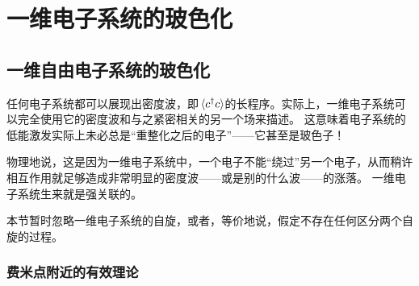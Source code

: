 \chapter{一维电子系统的玻色化}

\section{一维自由电子系统的玻色化}

任何电子系统都可以展现出密度波，即$\expval*{{c}^\dagger {c}}$的长程序。实际上，一维电子系统可以完全使用它的密度波和与之紧密相关的另一个场来描述。
这意味着电子系统的低能激发实际上未必总是“重整化之后的电子”——它甚至是玻色子！

物理地说，这是因为一维电子系统中，一个电子不能“绕过”另一个电子，从而稍许相互作用就足够造成非常明显的密度波——或是别的什么波——的涨落。
一维电子系统生来就是强关联的。

本节暂时忽略一维电子系统的自旋，或者，等价地说，假定不存在任何区分两个自旋的过程。

\subsection{费米点附近的有效理论}

